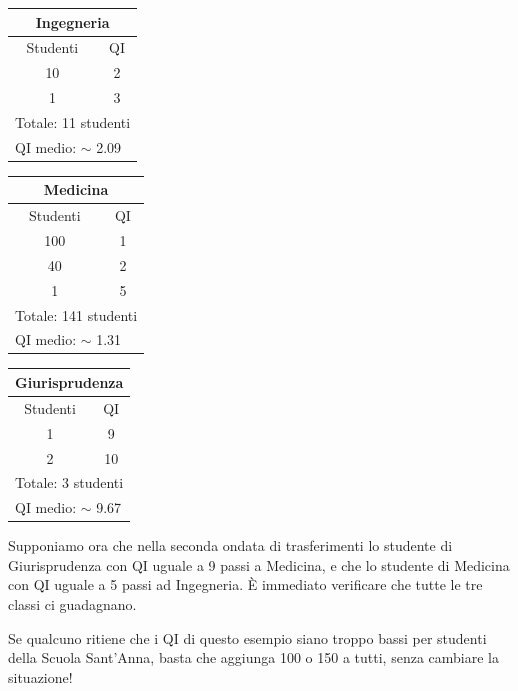 {\hfill
{\renewcommand{\arraystretch}{1.3}
\begin{tabular}{|c|c|}
    \hline
    \multicolumn{2}{|c|}{\textbf{Ingegneria}}  \\
    \hline
    Studenti & QI  \\
    \hline\hline
    10 & 2  \\
    \hline
    1 & 3  \\
    \hline\hline
    \multicolumn{2}{|l|}{Totale: 11 studenti}  \\
    \multicolumn{2}{|l|}{QI medio: $\sim$ 2.09}  \\
    \hline
\end{tabular}
\hfill
\begin{tabular}{|c|c|}
    \hline
    \multicolumn{2}{|c|}{\textbf{Medicina}}  \\
    \hline
    Studenti & QI  \\
    \hline\hline
    100 & 1  \\
    \hline
    40 & 2  \\
    \hline
    1 & 5  \\
    \hline\hline
    \multicolumn{2}{|l|}{Totale: 141 studenti}  \\
    \multicolumn{2}{|l|}{QI medio: $\sim$ 1.31}  \\
    \hline
\end{tabular}
\hfill
\begin{tabular}{|c|c|}
    \hline
    \multicolumn{2}{|c|}{\textbf{Giurisprudenza}}  \\
    \hline
    Studenti & QI  \\
    \hline\hline
    1 & 9  \\
    \hline
    2 & 10  \\
    \hline\hline
    \multicolumn{2}{|l|}{Totale: 3 studenti}  \\
    \multicolumn{2}{|l|}{QI medio: $\sim$ 9.67}  \\
    \hline
\end{tabular}
}
\hfill\mbox{}
\medskip

Supponiamo ora che nella seconda ondata di trasferimenti lo studente di Giurisprudenza con QI uguale a 9 passi a Medicina, e che lo studente di Medicina con QI uguale a 5 passi ad Ingegneria. È immediato verificare che tutte le tre classi ci guadagnano.

Se qualcuno ritiene che i QI di questo esempio siano troppo bassi per studenti della Scuola Sant'Anna, basta che aggiunga 100 o 150 a tutti, senza cambiare la situazione!
}

\renewcommand{\SoluzioniAlternative}{}

\renewcommand{\Osservazioni}{\TitoloOsservazione Non è difficile
dimostrare che la situazione descritta al punto (b) è impossibile se tutti i 4 trasferimenti coinvolgono ciascuno uno studente solo (o
comunque se tutti i 4 trasferimenti coinvolgono lo \emph{stesso}
numero di studenti). Con ovvio significato dei simboli si avrebbe infatti che
$$T_{I\to M}<I_{1}<I_{2}<T_{M\to I}<T_{G\to M}<
G_{2}<T_{M\to G}<T_{I\to M},$$
il che è ovviamente assurdo. Le singole disuguaglianze si dimostrano con ragionamenti analoghi a quelli utilizzati per il punto (a).
}

\renewcommand{\Commenti}{
}